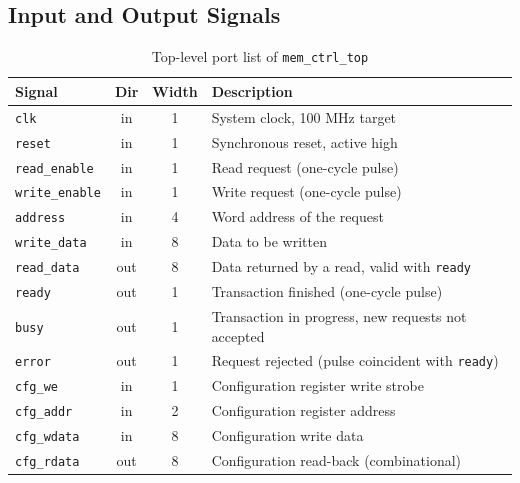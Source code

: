 \documentclass[11pt,a4paper]{article}
\newcommand{\sig}[1]{\texttt{#1}}
\begin{document}
\subsection{Input and Output Signals}
\begin{table}[H]
\centering
\caption{Top-level port list of \texttt{mem\_ctrl\_top}}
\label{tab:io}
\small
\begin{tabularx}{\textwidth}{@{}l c c X@{}}
\toprule
\textbf{Signal} & \textbf{Dir} & \textbf{Width} & \textbf{Description} \\
\midrule
\sig{clk} & in & 1 & System clock, 100 MHz target \\
\sig{reset} & in & 1 & Synchronous reset, active high \\
\sig{read\_enable} & in & 1 & Read request (one-cycle pulse) \\
\sig{write\_enable} & in & 1 & Write request (one-cycle pulse) \\
\sig{address} & in & 4 & Word address of the request \\
\sig{write\_data} & in & 8 & Data to be written \\
\sig{read\_data} & out & 8 & Data returned by a read, valid with \sig{ready} \\
\sig{ready} & out & 1 & Transaction finished (one-cycle pulse) \\
\sig{busy} & out & 1 & Transaction in progress, new requests not accepted \\
\sig{error} & out & 1 & Request rejected (pulse coincident with \sig{ready}) \\
\sig{cfg\_we} & in & 1 & Configuration register write strobe \\
\sig{cfg\_addr} & in & 2 & Configuration register address \\
\sig{cfg\_wdata} & in & 8 & Configuration write data \\
\sig{cfg\_rdata} & out & 8 & Configuration read-back (combinational) \\
\bottomrule
\end{tabularx}
\end{table}
\end{document}
